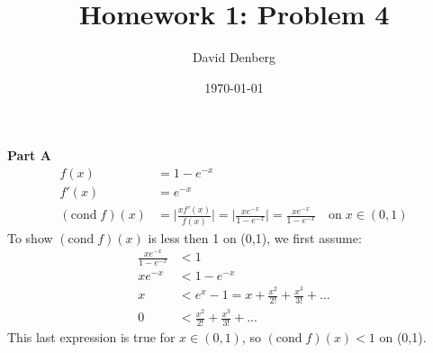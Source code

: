\documentclass[12pt]{article}
\title{Homework 1: Problem 4}
\author{David Denberg}
\date{\today}
\begin{document}
\maketitle
\noindent
\textbf{Part A}
\begin{align*}
f(x) &= 1 - e^{-x}
\\
f'(x) &= e^{-x}
\\
(\mathrm{cond} \; f)(x) &= \bigg|\frac{x f'(x)}{f(x)}\bigg| = \bigg|\frac{x e^{-x}}{1 - e^{-x}}\bigg| = \frac{x e^{-x}}{1 - e^{-x}} \quad \mathrm{on} \; x \in (0,1)
\end{align*}
To show $(\mathrm{cond} \; f)(x)$ is less then 1 on (0,1), we first assume:
\begin{align*}
\frac{x e^{-x}}{1 - e^{-x}} &< 1
\\
x e^{-x} &< 1 - e^{-x}
\\
x &< e^x - 1 = x + \frac{x^2}{2!} + \frac{x^3}{3!} + ... 
\\
0 &< \frac{x^2}{2!} + \frac{x^3}{3!} + ...
\end{align*}
This last expression is true for $x \in (0,1)$, so $(\mathrm{cond} \; f)(x) < 1$ on (0,1).
\end{document}
